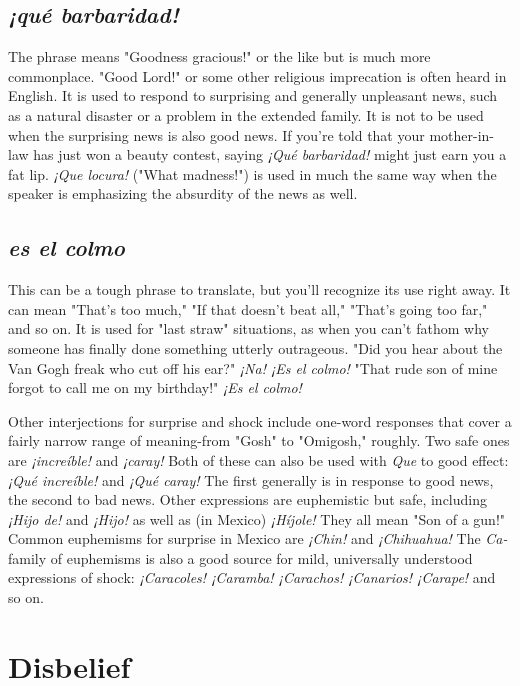 \subsection{\emph{¡qué barbaridad!}}

The phrase means "Goodness gracious!" or the like but is
much more commonplace. "Good Lord!" or some other religious imprecation is often heard in English. It is used to respond to surprising
and generally unpleasant news, such as a natural disaster or a problem
in the extended family. It is not to be used when the surprising news is
also good news. If you're told that your mother-in-law has just won a
beauty contest, saying \emph{¡Qué barbaridad!} might just earn you a fat lip.
\emph{¡Que locura!} ("What madness!") is used in much the same way when
the speaker is emphasizing the absurdity of the news as well.

\subsection{\emph{es el colmo}}

This can be a tough phrase to translate, but you'll recognize
its use right away. It can mean "That's too much," "If that doesn't beat
all," "That's going too far," and so on. It is used for "last straw" situations, as when you can't fathom why someone has finally done something utterly outrageous. "Did you hear about the Van Gogh freak who
cut off his ear?" \emph{¡Na! ¡Es el colmo!} "That rude son of mine forgot to
call me on my birthday!" \emph{¡Es el colmo!}

Other interjections for surprise and shock include one-word
responses that cover a fairly narrow range of meaning-from "Gosh"
to "Omigosh," roughly. Two safe ones are \emph{¡increíble!} and \emph{¡caray!} Both
of these can also be used with \emph{Que} to good effect: \emph{¡Qué increíble!} and
\emph{¡Qué caray!} The first generally is in response to good news, the second
to bad news. Other expressions are euphemistic but safe, including
\emph{¡Hijo de!} and \emph{¡Hijo!} as well as (in Mexico) \emph{¡Híjole!} They all mean "Son
of a gun!" Common euphemisms for surprise in Mexico are \emph{¡Chin!} and
\emph{¡Chihuahua!} The \emph{Ca-} family of euphemisms is also a good source for
mild, universally understood expressions of shock: \emph{¡Caracoles! ¡Caramba! ¡Carachos! ¡Canarios! ¡Carape!} and so on.

\section{Disbelief}

